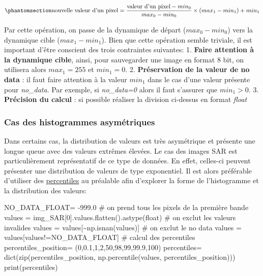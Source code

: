 \documentclass[
  11pt,
  letterpaper,
  open=any,
  twoside=false,
  french]{scrbook}
\newenvironment{Shaded}{\begin{snugshade}}{\end{snugshade}}
\newcommand{\BuiltInTok}[1]{\textcolor[rgb]{0.00,0.23,0.31}{#1}}
\newcommand{\CommentTok}[1]{\textcolor[rgb]{0.37,0.37,0.37}{#1}}
\newcommand{\DecValTok}[1]{\textcolor[rgb]{0.68,0.00,0.00}{#1}}
\newcommand{\FloatTok}[1]{\textcolor[rgb]{0.68,0.00,0.00}{#1}}
\newcommand{\NormalTok}[1]{\textcolor[rgb]{0.00,0.23,0.31}{#1}}
\newcommand{\OperatorTok}[1]{\textcolor[rgb]{0.37,0.37,0.37}{#1}}
\begin{document}
\begin{equation}\phantomsection\label{eq-rehauss-lin}{ \text{nouvelle valeur d'un pixel} = \frac{\text{valeur d'un pixel} - min_0}{max_0 - min_0}\times (max_1 - min_1)+min_1}\end{equation}

Par cette opération, on passe de la dynamique de départ
(\(max_0 - min_0\)) vers la dynamique cible (\(max_1 - min_1\)). Bien
que cette opération semble triviale, il est important d'être conscient
des trois contraintes suivantes: 1. \textbf{Faire attention à la
dynamique cible}, ainsi, pour sauvegarder une image en format 8 bit, on
utilisera alors \(max_1=255\) et \(min_1=0\). 2. \textbf{Préservation de
la valeur de no data} : il faut faire attention à la valeur \(min_1\)
dans le cas d'une valeur présente pour \emph{no\_data}. Par exemple, si
\emph{no\_data=0} alors il faut s'assurer que \(min_1>0\). 3.
\textbf{Précision du calcul} : si possible réaliser la division
ci-dessus en format \emph{float}

\subsubsection{Cas des histogrammes
asymétriques}\label{cas-des-histogrammes-asymuxe9triques}

Dans certains cas, la distribution de valeurs est très asymétrique et
présente une longue queue avec des valeurs extrêmes élevées. Le cas des
images SAR est particulièrement représentatif de ce type de données. En
effet, celles-ci peuvent présenter une distribution de valeurs de type
exponentiel. Il est alors préférable d'utiliser des
\href{https://fr.wikipedia.org/wiki/Centile}{percentiles} au préalable
afin d'explorer la forme de l'histogramme et la distribution des
valeurs:

\begin{Shaded}
\begin{Highlighting}[]
\NormalTok{NO\_DATA\_FLOAT}\OperatorTok{=} \OperatorTok{{-}}\FloatTok{999.0}
\CommentTok{\# on prend tous les pixels de la première bande}
\NormalTok{values }\OperatorTok{=}\NormalTok{ img\_SAR[}\DecValTok{0}\NormalTok{].values.flatten().astype(}\BuiltInTok{float}\NormalTok{)}
\CommentTok{\# on exclut les valeurs invalides}
\NormalTok{values }\OperatorTok{=}\NormalTok{ values[}\OperatorTok{\textasciitilde{}}\NormalTok{np.isnan(values)]}
\CommentTok{\# on exclut le no data}
\NormalTok{values }\OperatorTok{=}\NormalTok{ values[values}\OperatorTok{!=}\NormalTok{NO\_DATA\_FLOAT]}
\CommentTok{\# calcul des percentiles}
\NormalTok{percentiles\_position}\OperatorTok{=}\NormalTok{ (}\DecValTok{0}\NormalTok{,}\FloatTok{0.1}\NormalTok{,}\DecValTok{1}\NormalTok{,}\DecValTok{2}\NormalTok{,}\DecValTok{50}\NormalTok{,}\DecValTok{98}\NormalTok{,}\DecValTok{99}\NormalTok{,}\FloatTok{99.9}\NormalTok{,}\DecValTok{100}\NormalTok{)}
\NormalTok{percentiles}\OperatorTok{=} \BuiltInTok{dict}\NormalTok{(}\BuiltInTok{zip}\NormalTok{(percentiles\_position, np.percentile(values, percentiles\_position)))}
\BuiltInTok{print}\NormalTok{(percentiles)}
\end{Highlighting}
\end{Shaded}
\end{document}
